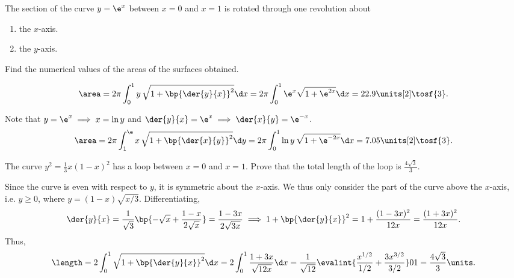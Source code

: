 \begin{problem}
    The section of the curve $y = \e^x$ between $x = 0$ and $x = 1$ is rotated through one revolution about
    \begin{enumerate}
        \item the $x$-axis.
        \item the $y$-axis.
    \end{enumerate}
    Find the numerical values of the areas of the surfaces obtained.
\end{problem}
\begin{solution}
    \begin{ppart}
        \[\area = 2\pi \int_0^1 y \, \sqrt{1 + \bp{\der{y}{x}}^2} \d x = 2\pi \int_0^1 \e^x \sqrt{1 + \e^{2x}} \d x = 22.9 \units[2] \tosf{3}.\]
    \end{ppart}
    \begin{ppart}
        Note that $y = \e^x \implies x = \ln y$ and $\der{y}{x} = \e^x \implies \der{x}{y} = \e^{-x}$. \[\area = 2\pi \int_1^\e x \, \sqrt{1 + \bp{\der{x}{y}}^2} \d y = 2\pi \int_0^1 \ln y \, \sqrt{1 + \e^{-2x}} \d x = 7.05 \units[2] \tosf{3}.\]
    \end{ppart}
\end{solution}

\clearpage
\begin{problem}
    The curve $y^2 = \frac13 x(1-x)^2$ has a loop between $x = 0$ and $x = 1$. Prove that the total length of the loop is $\frac{4\sqrt{3}}{3}$.
\end{problem}
\begin{solution}
    Since the curve is even with respect to $y$, it is symmetric about the $x$-axis. We thus only consider the part of the curve above the $x$-axis, i.e. $y \geq 0$, where $y = (1-x)\sqrt{x/3}$. Differentiating, \[\der{y}{x} = \frac1{\sqrt3} \bp{-\sqrt{x} + \frac{1-x}{2\sqrt{x}}} = \frac{1-3x}{2\sqrt{3x}} \implies 1 + \bp{\der{y}{x}}^2 = 1 + \frac{(1-3x)^2}{12x} = \frac{(1+3x)^2}{12x}.\] Thus, \[\length = 2 \int_0^1 \sqrt{1 + \bp{\der{y}{x}}^2} \d x = 2 \int_0^1 \frac{1+3x}{\sqrt{12x}} \d x = \frac{1}{\sqrt{12}} \evalint{\frac{x^{1/2}}{1/2} + \frac{3x^{3/2}}{3/2}}01 = \frac{4\sqrt3}3 \units.\]
\end{solution}

